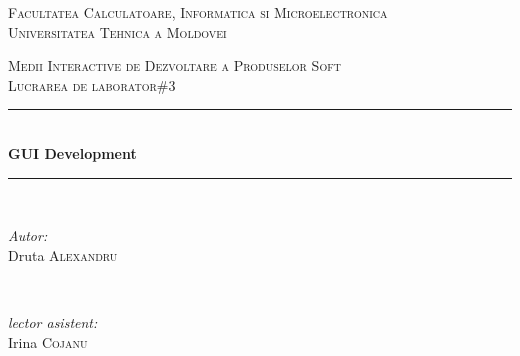 \begin{titlepage}


  \begin{center} 

  \textsc{\large Facultatea Calculatoare, Informatica si Microelectronica}\\[0.5cm]
  \textsc{\large Universitatea Tehnica a Moldovei}\\[1.2cm] 
  \vspace{25 mm}

  \textsc{\Large Medii Interactive de Dezvoltare a Produselor Soft}\\[0.5cm] 
  \textsc{\large Lucrarea de laborator\#3}\\[0.5cm]
  
\newcommand{\HRule}{\rule{\linewidth}{0.5mm}} 

  \vspace{10 mm}
  \HRule \\[0.4cm]
  { \LARGE \bfseries GUI Development  }\\[0.4cm] 
  \HRule \\[1.5cm]

      \vspace{30mm}

      \begin{minipage}{0.4\textwidth}
      \begin{flushleft} \large
      \emph{Autor:}\\
      Druta \textsc{Alexandru}
      \end{flushleft}
      \end{minipage}
      ~
      \begin{minipage}{0.4\textwidth}
      \begin{flushright} \large
      \emph{lector asistent:} \\
      Irina \textsc{Cojanu} \\  
      
      \end{flushright}
      \end{minipage}\\[4cm]

      \vspace{5 mm}
     
      \vfill
      \end{center}
      
\end{titlepage}